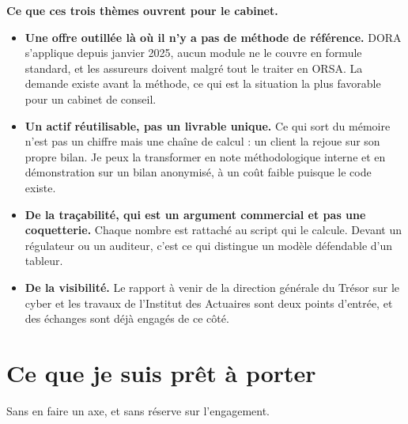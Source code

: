 \documentclass[11pt,a4paper]{article}
\begin{document}
\vspace{2pt}
\noindent\textbf{Ce que ces trois thèmes ouvrent pour le cabinet.}
\begin{itemize}
\item \textbf{Une offre outillée là où il n'y a pas de méthode de référence.} DORA
      s'applique depuis janvier 2025, aucun module ne le couvre en formule standard, et les
      assureurs doivent malgré tout le traiter en ORSA. La demande existe avant la méthode,
      ce qui est la situation la plus favorable pour un cabinet de conseil.
\item \textbf{Un actif réutilisable, pas un livrable unique.} Ce qui sort du mémoire n'est
      pas un chiffre mais une chaîne de calcul : un client la rejoue sur son propre bilan.
      Je peux la transformer en note méthodologique interne et en démonstration sur un
      bilan anonymisé, à un coût faible puisque le code existe.
\item \textbf{De la traçabilité, qui est un argument commercial et pas une coquetterie.}
      Chaque nombre est rattaché au script qui le calcule. Devant un régulateur ou un
      auditeur, c'est ce qui distingue un modèle défendable d'un tableur.
\item \textbf{De la visibilité.} Le rapport à venir de la direction générale du Trésor sur
      le cyber et les travaux de l'Institut des Actuaires sont deux points d'entrée, et des
      échanges sont déjà engagés de ce côté.
\end{itemize}

\section{Ce que je suis prêt à porter}

\noindent Sans en faire un axe, et sans réserve sur l'engagement.
\end{document}
